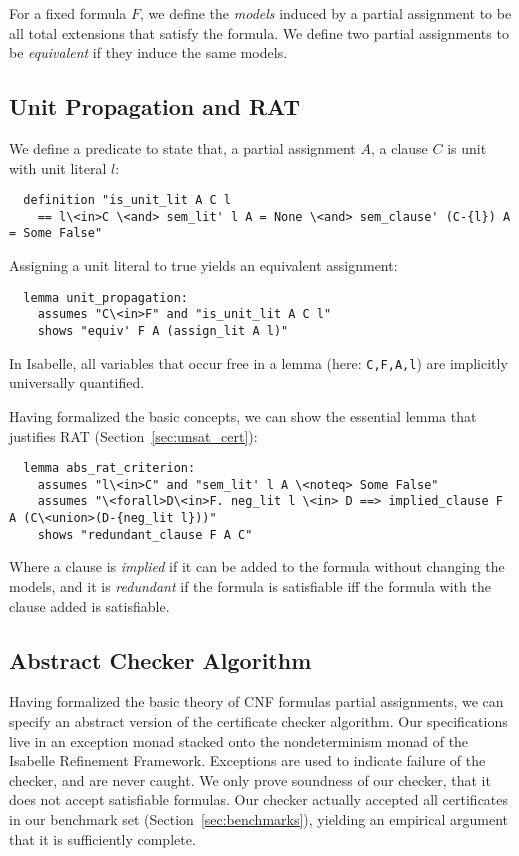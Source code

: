 \documentclass{llncs}
\newcommand{\isai}{\lstinline[language=isabelle,basicstyle=\normalsize\ttfamily\slshape]}
\begin{document}
For a fixed formula $F$, we define the \emph{models} induced by a partial assignment to be all total extensions that satisfy the formula. 
We define two partial assignments to be \emph{equivalent} if they induce the same models.

\subsection{Unit Propagation and RAT}
We define a predicate to state that, \wrt a partial assignment $A$, a clause $C$ is unit with unit literal $l$:
\begin{lstlisting}
  definition "is_unit_lit A C l 
    == l\<in>C \<and> sem_lit' l A = None \<and> sem_clause' (C-{l}) A = Some False"
\end{lstlisting}
Assigning a unit literal to true yields an equivalent assignment:
\begin{lstlisting}
  lemma unit_propagation:
    assumes "C\<in>F" and "is_unit_lit A C l"
    shows "equiv' F A (assign_lit A l)"
\end{lstlisting}
In Isabelle, all variables that occur free in a lemma (here: \isai{C,F,A,l}) are implicitly universally quantified.

Having formalized the basic concepts, we can show the essential lemma that justifies RAT (\cf Section~\ref{sec:unsat_cert}):
\begin{lstlisting}
  lemma abs_rat_criterion:
    assumes "l\<in>C" and "sem_lit' l A \<noteq> Some False"
    assumes "\<forall>D\<in>F. neg_lit l \<in> D ==> implied_clause F A (C\<union>(D-{neg_lit l}))"  
    shows "redundant_clause F A C"
\end{lstlisting}
Where a clause is \emph{implied} if it can be added to the formula without changing the models, 
and it is \emph{redundant} if the formula is satisfiable iff the formula with the clause added is satisfiable.

% 
% 
% 

\subsection{Abstract Checker Algorithm}
Having formalized the basic theory of CNF formulas \wrt partial assignments, we can specify an abstract version of the certificate checker algorithm.
Our specifications live in an exception monad stacked onto the nondeterminism monad of the Isabelle Refinement Framework.
Exceptions are used to indicate failure of the checker, and are never caught.
%
We only prove soundness of our checker, \ie that it does not accept satisfiable formulas.
Our checker actually accepted all certificates in our benchmark set (\cf Section~\ref{sec:benchmarks}), yielding 
an empirical argument that it is sufficiently complete.
\end{document}
